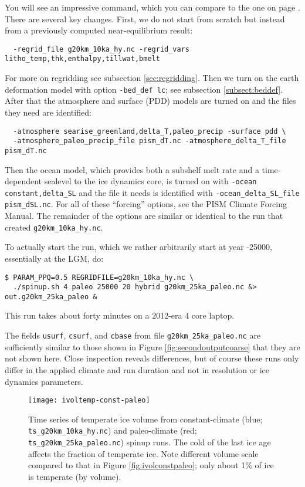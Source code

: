 You will see an impressive command, which you can compare to the one on  page \pageref{firstcommand}.  There are several key changes.  First, we do not start from scratch but instead from a previously computed near-equilibrium result:
\begin{verbatim}
  -regrid_file g20km_10ka_hy.nc -regrid_vars litho_temp,thk,enthalpy,tillwat,bmelt
\end{verbatim}
For more on regridding see subsection \ref{sec:regridding}.  Then we turn on the earth deformation model with option \verb|-bed_def lc|; see subsection \ref{subsect:beddef}.  After that the atmosphere and surface (PDD) models are turned on and the files they need are identified:
\begin{verbatim}
  -atmosphere searise_greenland,delta_T,paleo_precip -surface pdd \
  -atmosphere_paleo_precip_file pism_dT.nc -atmosphere_delta_T_file pism_dT.nc
\end{verbatim}
Then the ocean model, which provides both a subshelf melt rate and a time-dependent sealevel to the ice dynamics core, is turned on with \verb|-ocean constant,delta_SL| and the file it needs is identified with \verb|-ocean_delta_SL_file pism_dSL.nc|.  For all of these ``forcing'' options, see the PISM Climate Forcing Manual.  The remainder of the options are similar or identical to the run that created \verb|g20km_10ka_hy.nc|.

To actually start the run, which we rather arbitrarily start at year -25000, essentially at the LGM, do:
\begin{verbatim}
$ PARAM_PPQ=0.5 REGRIDFILE=g20km_10ka_hy.nc \
  ./spinup.sh 4 paleo 25000 20 hybrid g20km_25ka_paleo.nc &> out.g20km_25ka_paleo &
\end{verbatim}
This run takes about forty minutes on a 2012-era 4 core laptop.

The fields \texttt{usurf}, \texttt{csurf}, and \texttt{cbase} from file \texttt{g20km_25ka_paleo.nc} are sufficiently similar to those shown in Figure \ref{fig:secondoutputcoarse} that they are not shown here.  Close inspection reveals differences, but of course these runs only differ in the applied climate and run duration and not in resolution or ice dynamics parameters.

\begin{figure}[ht]
\centering
\texttt{[image: ivoltemp-const-paleo]}
\caption{Time series of temperate ice volume from constant-climate (blue; \texttt{ts_g20km_10ka_hy.nc}) and paleo-climate (red; \texttt{ts_g20km_25ka_paleo.nc}) spinup runs.  The cold of the last ice age affects the fraction of temperate ice.  Note different volume scale compared to that in Figure \ref{fig:ivolconstpaleo}; only about 1\% of ice is temperate (by volume).}
\label{fig:ivoltempconstpaleo}
\end{figure}

